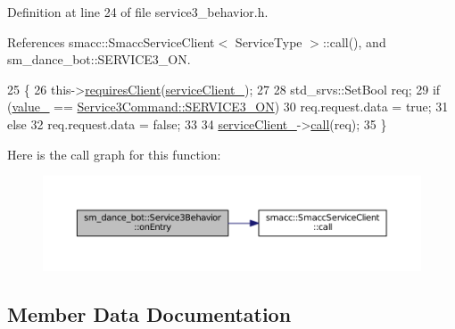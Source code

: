 Definition at line 24 of file service3\+\_\+behavior.\+h.



References smacc\+::\+Smacc\+Service\+Client$<$ Service\+Type $>$\+::call(), and sm\+\_\+dance\+\_\+bot\+::\+S\+E\+R\+V\+I\+C\+E3\+\_\+\+ON.


\begin{DoxyCode}
25   \{
26     this->\hyperlink{classsmacc_1_1SmaccClientBehavior_adc21bbd45d36bd81ca6f778ed161807a}{requiresClient}(\hyperlink{classsm__dance__bot_1_1Service3Behavior_afe77243f8c5938cf9c754897d41cceff}{serviceClient\_});
27 
28     std\_srvs::SetBool req;
29     \textcolor{keywordflow}{if} (\hyperlink{classsm__dance__bot_1_1Service3Behavior_a85d2c6056f1cc77bcfc0139c4ce71ba9}{value\_} == \hyperlink{namespacesm__dance__bot_a2d0902aa29698165effd2c3248a9c8ffa13cdca48a01bbb44fa8fb35567fbc58e}{Service3Command::SERVICE3\_ON})
30       req.request.data = \textcolor{keyword}{true};
31     \textcolor{keywordflow}{else}
32       req.request.data = \textcolor{keyword}{false};
33 
34     \hyperlink{classsm__dance__bot_1_1Service3Behavior_afe77243f8c5938cf9c754897d41cceff}{serviceClient\_}->\hyperlink{classsmacc_1_1SmaccServiceClient_a1b749ce13f3cb1dbf10a5992c05c173e}{call}(req);
35   \}
\end{DoxyCode}


Here is the call graph for this function\+:
\nopagebreak
\begin{figure}[H]
\begin{center}
\leavevmode
\includegraphics[width=350pt]{classsm__dance__bot_1_1Service3Behavior_a865256f9d383977aa2a8666678f402bc_cgraph}
\end{center}
\end{figure}




\subsection{Member Data Documentation}
